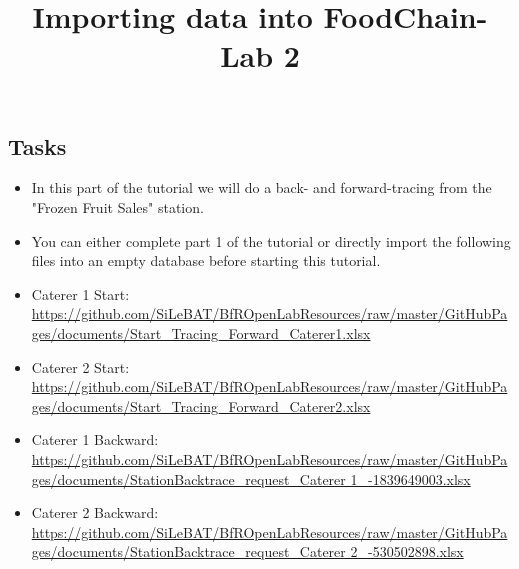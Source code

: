\documentclass{beamer}
\title{Importing data into FoodChain-Lab 2}
\date{}
\begin{document}
\maketitle

\section{ }

\subsection{Tasks}
\begin{frame}
	\begin{itemize}
		\item In this part of the tutorial we will do a back- and forward-tracing from the "Frozen Fruit Sales" station.
		\item You can either complete part 1 of the tutorial or directly import the following files into an empty database before starting this tutorial.
		\item Caterer 1 Start: \url{https://github.com/SiLeBAT/BfROpenLabResources/raw/master/GitHubPages/documents/Start_Tracing_Forward_Caterer1.xlsx}
		\item Caterer 2 Start: \url{https://github.com/SiLeBAT/BfROpenLabResources/raw/master/GitHubPages/documents/Start_Tracing_Forward_Caterer2.xlsx}
		\item Caterer 1 Backward: \url{https://github.com/SiLeBAT/BfROpenLabResources/raw/master/GitHubPages/documents/StationBacktrace_request_Caterer 1_-1839649003.xlsx}
		\item Caterer 2 Backward: \url{https://github.com/SiLeBAT/BfROpenLabResources/raw/master/GitHubPages/documents/StationBacktrace_request_Caterer 2_-530502898.xlsx}
	\end{itemize}
\end{frame}
 
\end{document}
